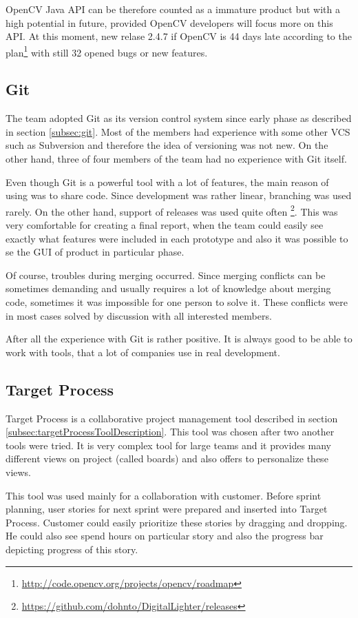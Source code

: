 OpenCV Java API can be therefore counted as a immature product but with a high potential in future, provided OpenCV developers will focus more on this API.
At this moment, new relase 2.4.7 if OpenCV is 44 days late according to the plan\footnote{\url{http://code.opencv.org/projects/opencv/roadmap}} with still 32 opened bugs or new features.

\subsection{Git}
The team adopted Git as its version control system since early phase as described in section \ref{subsec:git}.
Most of the members had experience with some other VCS such as Subversion and therefore the idea of versioning was not new.
On the other hand, three of four members of the team had no experience with Git itself.

Even though Git is a powerful tool with a lot of features, the main reason of using was to share code.
Since development was rather linear, branching was used rarely.
On the other hand, support of releases was used quite often \footnote{\url{https://github.com/dohnto/DigitalLighter/releases}}.
This was very comfortable for creating a final report, when the team could easily see exactly what features were included in each prototype and also it was possible to se the GUI of product in particular phase.

Of course, troubles during merging occurred.
Since merging conflicts can be sometimes demanding and usually requires a lot of knowledge about merging code, sometimes it was impossible for one person to solve it.
These conflicts were in most cases solved by discussion with all interested members.

After all the experience with Git is rather positive. 
It is always good to be able to work with tools, that a lot of companies use in real development.


\subsection{Target Process}
Target Process is a collaborative project management tool described in section \ref{subsec:targetProcessToolDescription}.
This tool was chosen after two another tools were tried.
It is very complex tool for large teams and it provides many different views on project (called boards) and also offers to personalize these views.

This tool was used mainly for a collaboration with customer. 
Before sprint planning, user stories for next sprint were prepared and inserted into Target Process.
Customer could easily prioritize these stories by dragging and dropping.
He could also see spend hours on particular story and also the progress bar depicting progress of this story.


